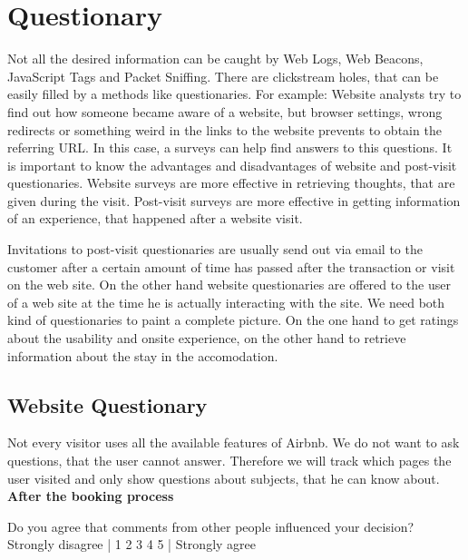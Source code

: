 \section{Questionary}
\label{sec:Questionary}
Not all the desired information can be caught by Web Logs, Web Beacons, JavaScript Tags and Packet Sniffing. There are clickstream holes, that can be easily filled by a methods like questionaries. For example: Website analysts try to find out how someone became aware of a website, but browser settings, wrong redirects or something weird in the links to the website prevents to obtain the referring URL. In this case, a surveys can help find answers to this questions. \citep[p. 64]{Kaushik07} It is important to know the advantages and disadvantages of website and post-visit questionaries. Website surveys are more effective in retrieving thoughts, that are given during the visit. Post-visit surveys are more effective in getting information of an experience, that happened after a website visit.
\vspace{0.2cm}

Invitations to post-visit questionaries are usually send out via email to the customer after a certain amount of time has passed after the transaction or visit on the web site. On the other hand website questionaries are offered to the user of a web site at the time he is actually interacting with the site. \citep[p. 65-66]{Kaushik07} We need both kind of questionaries to paint a complete picture. On the one hand to get ratings about the usability and onsite experience, on the other hand to retrieve information about the stay in the accomodation.

\subsection{Website Questionary}
\label{sec:Website_Questionary}

Not every visitor uses all the available features of Airbnb. We do not want to ask questions, that the user cannot answer. Therefore we will track which pages the user visited and only show questions about subjects, that he can know about.\\

\textbf{After the booking process}

\vspace{0.2cm}

Do you agree that comments from other people influenced your decision?
\newline
Strongly disagree | 1 2 3 4 5 | Strongly agree \\

